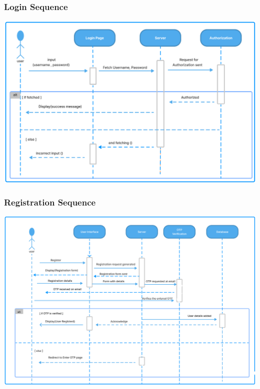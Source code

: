 \documentclass[11pt]{article}
\begin{document}
\subsubsection{Login Sequence}
\begin{center}
  \includegraphics[scale=0.35]{sequence-diagram-images/login.png}
\end{center}

\subsubsection{Registration Sequence}
\begin{center}
  \includegraphics[scale=0.3]{sequence-diagram-images/register.png}
\end{center}
\end{document}
